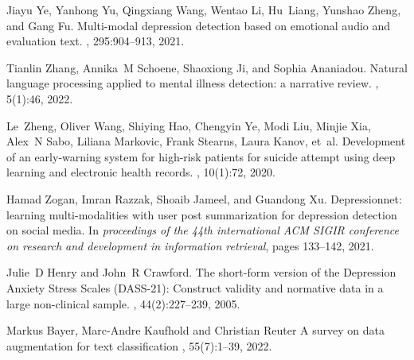 \begin{thebibliography}{10}
Jiayu Ye, Yanhong Yu, Qingxiang Wang, Wentao Li, Hu~Liang, Yunshao Zheng, and
  Gang Fu.
\newblock Multi-modal depression detection based on emotional audio and
  evaluation text.
, 295:904--913, 2021.

Tianlin Zhang, Annika~M Schoene, Shaoxiong Ji, and Sophia Ananiadou.
\newblock Natural language processing applied to mental illness detection: a
  narrative review.
, 5(1):46, 2022.

Le~Zheng, Oliver Wang, Shiying Hao, Chengyin Ye, Modi Liu, Minjie Xia, Alex~N
  Sabo, Liliana Markovic, Frank Stearns, Laura Kanov, et~al.
\newblock Development of an early-warning system for high-risk patients for
  suicide attempt using deep learning and electronic health records.
, 10(1):72, 2020.

Hamad Zogan, Imran Razzak, Shoaib Jameel, and Guandong Xu.
\newblock Depressionnet: learning multi-modalities with user post summarization
  for depression detection on social media.
\newblock In {\em proceedings of the 44th international ACM SIGIR conference on
  research and development in information retrieval}, pages 133--142, 2021.

Julie~D Henry and John~R Crawford.
\newblock The short-form version of the Depression Anxiety Stress Scales (DASS-21): Construct validity and normative data in a large non-clinical sample.
, 44(2):227--239, 2005.

Markus Bayer,  Marc-Andre Kaufhold and Christian Reuter
\newblock A survey on data augmentation for text classification
, 55(7):1--39, 2022.

\end{thebibliography}
